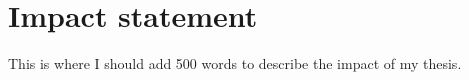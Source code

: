 \section*{Impact statement}

This is where I should add 500 words to describe the impact of my thesis.